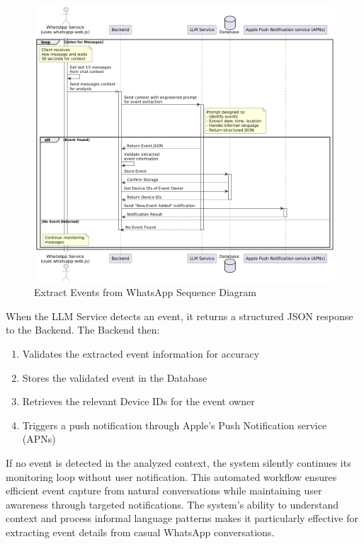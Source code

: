 \begin{figure}[!h]
  \centering
  \includegraphics[width=\textwidth]{images/docs/diagrams/sequence-diagrams/all-sequence-diagrams/Extract Events from WhatsApp.png}
  \caption{Extract Events from WhatsApp Sequence Diagram}
  \label{fig:seq/extract-events-whatsapp}
\end{figure}

When the LLM Service detects an event, it returns a structured JSON response to the Backend. The Backend then:
\begin{enumerate}
  \item Validates the extracted event information for accuracy
  \item Stores the validated event in the Database
  \item Retrieves the relevant Device IDs for the event owner
  \item Triggers a push notification through Apple's Push Notification service (APNs)
\end{enumerate}

If no event is detected in the analyzed context, the system silently continues its monitoring loop without user notification. This automated workflow ensures efficient event capture from natural conversations while maintaining user awareness through targeted notifications. The system's ability to understand context and process informal language patterns makes it particularly effective for extracting event details from casual WhatsApp conversations.